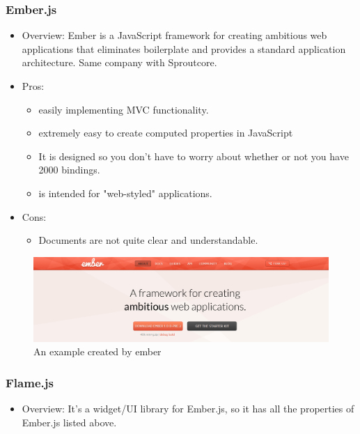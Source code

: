 \documentclass[14pt,a4paper]{extreport}
\begin{document}
		\subsubsection{Ember.js}
			\begin{itemize}
				\item Overview: Ember is a JavaScript framework for creating ambitious web applications that eliminates boilerplate and provides a standard application architecture. Same company with Sproutcore.
				\item Pros: 
					\begin{itemize}
						\item easily implementing MVC functionality.
						\item extremely easy to create computed properties in JavaScript
						\item It is designed so you don't have to worry about whether or not you have 2000 bindings.
						\item is intended for "web-styled" applications.
					\end{itemize}
				\item Cons:
					\begin{itemize}
						\item Documents are not quite clear and understandable.
					
					\end{itemize}
			\end{itemize}
			\begin{figure}
			\begin{center}
			\includegraphics[scale=0.5]{ember.png}
			\caption{An example created by ember}
			\end{center}			
			\end{figure}

		\subsubsection{Flame.js}
			\begin{itemize}
				\item Overview: It's a widget/UI library for Ember.js, so it has all the properties of Ember.js listed above.
				
			\end{itemize}
\end{document}
